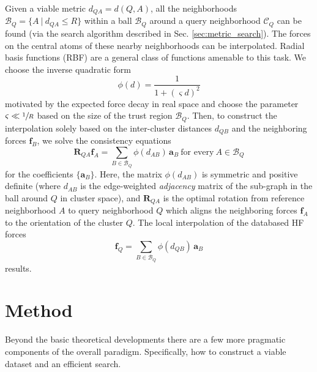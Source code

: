 \documentclass[journal=jctcce,manuscript=article]{achemso}
\newcommand{\sref}[1]{{Sec. \ref{#1}}}
\newcommand{\neighborhood}{\mathcal{C}}
\newcommand{\Ball}{\mathcal{B}}
\newcommand{\Bc}{\mathcal{B}}
\newcommand{\ab}{\mathbf{a}}
\newcommand{\fb}{\mathbf{f}}
\newcommand{\Rb}{\mathbf{R}}
\begin{document}
Given a viable metric $d_{QA} = d(Q,A)$, all the neighborhoods $\Bc_Q = \{ A \ | \ d_{QA} \le R \}$  within a ball $\Ball_Q$ around a query neighborhood $\neighborhood_Q$ can be found (via the search algorithm described in \sref{sec:metric_search}).
The forces on the central atoms of these nearby neighborhoods can be interpolated.
Radial basis functions (RBF) \cite{Buhmann2003} are a general class of functions amenable to this task.
We choose the inverse quadratic form
\begin{equation} \label{eq:rbf}
\phi(d) = \frac{1}{1+(\varsigma d)^2}
\end{equation}
motivated by the expected force decay in real space and choose the parameter $\varsigma \ll \sfrac{1}{R}$ based on the size of the trust region $\Bc_Q$.
Then,
to construct the interpolation solely based on the inter-cluster distances $d_{QB}$ and the neighboring forces $\fb_B$, we solve the consistency equations
\begin{equation} \label{eq:force_interpolation}
\Rb_{QA} \fb_A = \sum_{B\in \Ball_Q} \phi(d_{AB}) \, \ab_B  \ \text{for every} \ A  \in \Bc_Q
\end{equation}
for the coefficients $\{\ab_B\}$.
Here, the matrix $\phi(d_{AB})$ is symmetric and positive definite (where $d_{AB}$ is the edge-weighted \emph{adjacency} matrix of the sub-graph in the ball around $Q$ in cluster space), and $\Rb_{QA}$ is the optimal rotation from reference neighborhood $A$ to query neighborhood $Q$ which aligns the neighboring forces $\fb_A$ to the orientation of the cluster $Q$.
The local interpolation of the databased HF forces 
\begin{equation}
\fb_Q = \sum_{B\in \Ball_Q} \phi(d_{QB}) \, \ab_B 
\end{equation}
results.

\section{Method} \label{sec:method}

Beyond the basic theoretical developments there are a few more pragmatic components of the overall paradigm. 
Specifically, how to construct a viable dataset and an efficient search.
\end{document}
